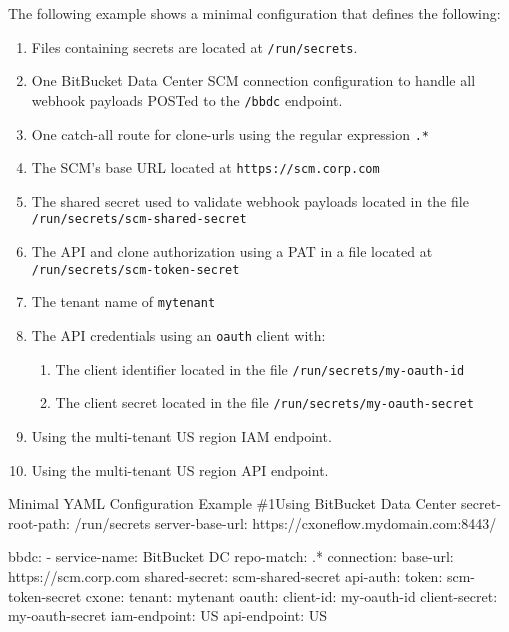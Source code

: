 The following example shows a minimal \cxoneflow configuration that defines the following:

\begin{enumerate}
    \item Files containing secrets are located at \texttt{/run/secrets}.
    \item One BitBucket Data Center SCM connection configuration to handle all webhook payloads
    POSTed to the \texttt{/bbdc} endpoint.
    \item One catch-all route for clone-urls using the regular expression \texttt{.*}
    \item The SCM's base URL located at \texttt{https://scm.corp.com}
    \item The shared secret used to validate webhook payloads located in the file \texttt{/run/secrets/scm-shared-secret}
    \item The API and clone authorization using a PAT in a file located at \texttt{/run/secrets/scm-token-secret}
    \item The \cxone tenant name of \texttt{mytenant}
    \item The \cxone API credentials using an \texttt{oauth} client with:
    \begin{enumerate}
        \item The client identifier located in the file \texttt{/run/secrets/my-oauth-id}
        \item The client secret located in the file \texttt{/run/secrets/my-oauth-secret}
    \end{enumerate}
    \item Using the \cxone multi-tenant US region IAM endpoint.
    \item Using the \cxone multi-tenant US region API endpoint.
\end{enumerate}

\begin{code}{Minimal YAML Configuration Example \#1}{Using BitBucket Data Center}{}
secret-root-path: /run/secrets
server-base-url: https://cxoneflow.mydomain.com:8443/

bbdc:
    - service-name: BitBucket DC
      repo-match: .*
      connection:
        base-url: https://scm.corp.com
        shared-secret: scm-shared-secret
        api-auth:
          token: scm-token-secret
      cxone:
        tenant: mytenant
        oauth:
          client-id: my-oauth-id
          client-secret: my-oauth-secret
        iam-endpoint: US
        api-endpoint: US
\end{code}

